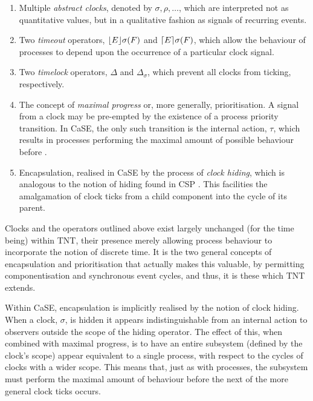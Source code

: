 \documentclass[orivec]{llncs}
\begin{document}
\begin{enumerate}
\item Multiple \emph{abstract clocks}, denoted by $\sigma, \rho, \dots$,
      which are interpreted not as quantitative values, but in a
      qualitative fashion as signals of recurring events.
\item Two \emph{timeout} operators, $\lfloor{E}\rfloor {\sigma} ({F})$ and
      $\lceil{E}\rceil {\sigma} ({F})$, which allow the behaviour of
      processes to depend upon the occurrence of a particular clock
      signal.
\item Two \emph{timelock} operators, $\Delta$ and $\Delta_{\sigma}$,
      which prevent all clocks  from ticking, respectively.
\item The concept of \emph{maximal progress} or, more generally,
      prioritisation.  A signal from a clock may be pre-empted by the
      existence of a process  priority
      transition.  In CaSE, the only such transition is the internal action,
      $\tau$, which results in processes performing the maximal amount
      of possible behaviour before .
\item Encapsulation, realised in CaSE by the process of \emph{clock
      hiding}, which is analogous to the notion of hiding found in
      CSP \cite{hoare:csp78}.  This facilities the amalgamation of clock ticks
      from a child component into the cycle of its parent.
\end{enumerate}

Clocks and the operators outlined above exist largely unchanged (for the
time being) within TNT, their presence merely allowing process behaviour
to incorporate the notion of discrete time.  It is the two general
concepts of encapsulation and prioritisation that actually makes this
valuable, by permitting componentisation and synchronous event cycles,
and thus, it is these which TNT extends.

Within CaSE, encapsulation is implicitly realised by the notion of clock
hiding.  When a clock, $\sigma$, is hidden it appears indistinguishable
from an internal action to observers outside the scope of the hiding
operator.  The effect of this, when combined with maximal progress, is
to have an entire subsystem (defined by the clock's scope) appear
equivalent to a single process, with respect to the cycles of clocks
with a wider scope.  This means that, just as with processes, the
subsystem must perform the maximal amount of behaviour before the next
of the more general clock ticks occurs.
\end{document}
